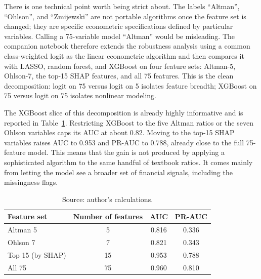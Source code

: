 \documentclass[12pt,a4paper]{article}
\begin{document}
There is one technical point worth being strict about. The labels
``Altman'', ``Ohlson'', and ``Zmijewski'' are not portable algorithms once the
feature set is changed; they are specific econometric specifications defined
by particular variables. Calling a 75-variable model ``Altman'' would be
misleading. The companion notebook therefore extends the robustness analysis
using a common class-weighted logit as the linear econometric algorithm and
then compares it with LASSO, random forest, and XGBoost on four feature sets:
Altman-5, Ohlson-7, the top-15 SHAP features, and all 75 features. This is the
clean decomposition: logit on 75 versus logit on 5 isolates feature breadth;
XGBoost on 75 versus logit on 75 isolates nonlinear modeling.

The XGBoost slice of this decomposition is already highly informative and is
reported in Table~\ref{tab:robust-features}. Restricting XGBoost to the five
Altman ratios or the seven Ohlson variables caps its AUC at about 0.82. Moving
to the top-15 SHAP variables raises AUC to 0.953 and PR-AUC to 0.788, already
close to the full 75-feature model. This means that the gain is not produced
by applying a sophisticated algorithm to the same handful of textbook ratios.
It comes mainly from letting the model see a broader set of financial signals,
including the missingness flags.

\begin{table}[H]
\centering
\caption{XGBoost performance by feature-set size at H1. The expanded notebook
runs the same feature-set grid for the transferable model classes (logit,
LASSO, random forest, XGBoost) and exports the full AUC and PR-AUC matrices.
The top-15 set is the SHAP importance ranking from Section~\ref{sec:shap}.}
\label{tab:robust-features}
\small
\begin{tabular}{lccc}
\toprule
Feature set & Number of features & AUC & PR-AUC \\
\midrule
Altman 5         &  5 & 0.816 & 0.336 \\
Ohlson 7         &  7 & 0.821 & 0.343 \\
Top 15 (by SHAP) & 15 & 0.953 & 0.788 \\
All 75           & 75 & 0.960 & 0.810 \\
\bottomrule
\end{tabular}
\caption*{\footnotesize Source: author's calculations.}
\end{table}
\end{document}
